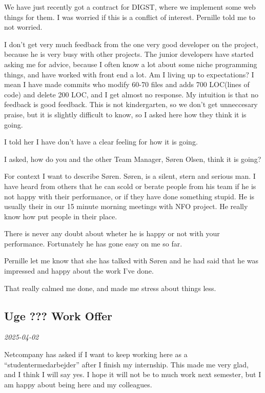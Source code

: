 \documentclass[../main.tex]{subfiles}
\begin{document}
We have just recently got a contract for DIGST, where we implement some web things for them. I was worried if this is a conflict of interest. Pernille told me to not worried.

I don't get very much feedback from the one very good developer on the project, because he is very busy with other projects. The junior developers have started asking me for advice, because I often know a lot about some niche programming things, and have worked with front end a lot. Am I living up to expectations? I mean I have made commits who modify 60-70 files and adds 700 LOC(lines of code) and delete 200 LOC, and I get almost no response. My intuition is that no feedback is good feedback. This is not kindergarten, so we don't get unneccesary praise, but it is slightly difficult to know, so I asked here how they think it is going.

I told her I have don't have a clear feeling for how it is going.

I asked, how do you and the other Team Manager, Søren Olsen, think it is going?

For context I want to describe Søren. Søren, is a silent, stern and serious man. I have heard from others that he can scold or berate people from his team if he is not happy with their performance, or if they have done something stupid. He is usually their in our 15 minute morning meetings with NFO project. He really know how put people in their place.

There is never any doubt about wheter he is happy or not with your performance. Fortunately he has gone easy on me so far.

Pernille let me know that she has talked with Søren and he had said that he was impressed and happy about the work I've
done.

That really calmed me done, and made me stress about things less. \\

\subsection{Uge ??? \textbf{Work Offer}}

\textit{2025-04-02}

Netcompany has asked if I want to keep working here as a
``studentermedarbejder'' after I finish my internship. This made me very
glad, and I think I will say yes. I hope it will not be to much work
next semester, but I am happy about being here and my colleagues. \\
\end{document}
